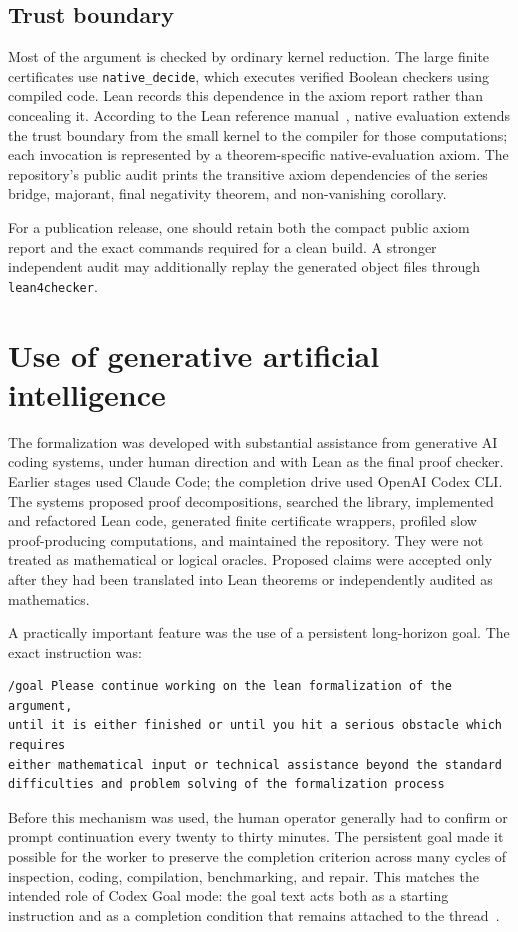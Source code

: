 \documentclass[11pt]{article}
\theoremstyle{definition}
\theoremstyle{remark}
\newcommand{\code}[1]{\texttt{#1}}
\begin{document}
\subsection{Trust boundary}

Most of the argument is checked by ordinary kernel reduction.  The large
finite certificates use \code{native\_decide}, which executes verified
Boolean checkers using compiled code.  Lean records this dependence in the
axiom report rather than concealing it.  According to the Lean reference
manual~\cite{LeanAxioms}, native evaluation extends the trust boundary from
the small kernel to the compiler for those computations; each invocation is
represented by a theorem-specific native-evaluation axiom.  The repository's
public audit prints the transitive axiom dependencies of the series bridge,
majorant, final negativity theorem, and non-vanishing corollary.

For a publication release, one should retain both the compact public axiom
report and the exact commands required for a clean build.  A stronger
independent audit may additionally replay the generated object files through
\code{lean4checker}.

\section{Use of generative artificial intelligence}\label{sec:ai}

The formalization was developed with substantial assistance from generative
AI coding systems, under human direction and with Lean as the final proof
checker.  Earlier stages used Claude Code; the completion drive used OpenAI
Codex CLI.  The systems proposed proof decompositions, searched the library,
implemented and refactored Lean code, generated finite certificate wrappers,
profiled slow proof-producing computations, and maintained the repository.
They were not treated as mathematical or logical oracles.  Proposed claims
were accepted only after they had been translated into Lean theorems or
independently audited as mathematics.

A practically important feature was the use of a persistent long-horizon goal.
The exact instruction was:
\begin{lstlisting}
/goal Please continue working on the lean formalization of the argument,
until it is either finished or until you hit a serious obstacle which requires
either mathematical input or technical assistance beyond the standard
difficulties and problem solving of the formalization process
\end{lstlisting}
Before this mechanism was used, the human operator generally had to confirm or
prompt continuation every twenty to thirty minutes.  The persistent goal made
it possible for the worker to preserve the completion criterion across many
cycles of inspection, coding, compilation, benchmarking, and repair.  This
matches the intended role of Codex Goal mode: the goal text acts both as a
starting instruction and as a completion condition that remains attached to
the thread~\cite{OpenAIGoals}.
\end{document}
